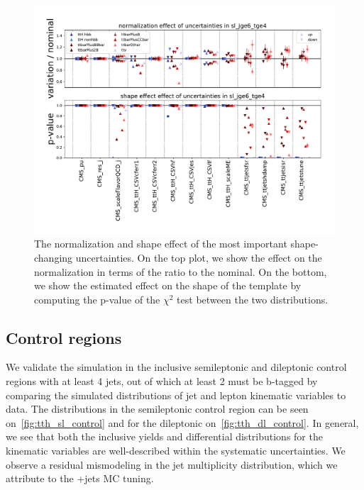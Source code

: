\begin{figure}
\begin{centering}
\includegraphics[width=1.0\textwidth]{figures/tth/uncs_sl_jge6_tge4.pdf}
\caption[The normalization and shape effect of uncertainties.]{The normalization and shape effect of the most important shape-changing uncertainties. On the top plot, we show the effect on the normalization in terms of the ratio to the nominal. On the bottom, we show the estimated effect on the shape of the template by computing the p-value of the $\chi^2$ test between the two distributions.}
\label{fig:tth_uncertainties_effect}
\end{centering}
\end{figure}

\subsection{Control regions}
We validate the simulation in the inclusive semileptonic and dileptonic control regions with at least 4 jets, out of which at least 2 must be b-tagged by comparing the simulated distributions of jet and lepton kinematic variables to data. The distributions in the semileptonic control region can be seen on~\cref{fig:tth_sl_control} and for the dileptonic on~\cref{fig:tth_dl_control}. In general, we see that both the inclusive yields and differential distributions for the kinematic variables are well-described within the systematic uncertainties. We observe a residual mismodeling in the jet multiplicity distribution, which we attribute to the \ttbar+jets MC tuning.

